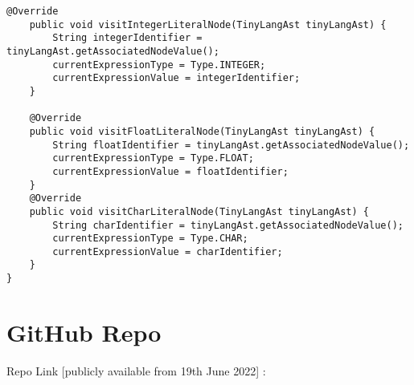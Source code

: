 \begin{lstlisting}[basicstyle=\miniscule,caption=Interpreter,label=listing:interpreter]
	@Override
	public void visitIntegerLiteralNode(TinyLangAst tinyLangAst) {
		String integerIdentifier = tinyLangAst.getAssociatedNodeValue();
		currentExpressionType = Type.INTEGER;
		currentExpressionValue = integerIdentifier;
	}

	@Override
	public void visitFloatLiteralNode(TinyLangAst tinyLangAst) {
		String floatIdentifier = tinyLangAst.getAssociatedNodeValue();
		currentExpressionType = Type.FLOAT;
		currentExpressionValue = floatIdentifier;
	}
	@Override
	public void visitCharLiteralNode(TinyLangAst tinyLangAst) {
		String charIdentifier = tinyLangAst.getAssociatedNodeValue();
		currentExpressionType = Type.CHAR;
		currentExpressionValue = charIdentifier;		
	}
}
\end{lstlisting}
\section{GitHub Repo}
  Repo Link [publicly available from 19th June 2022] : \href{https://github.com/andimon/tinylang}{}

